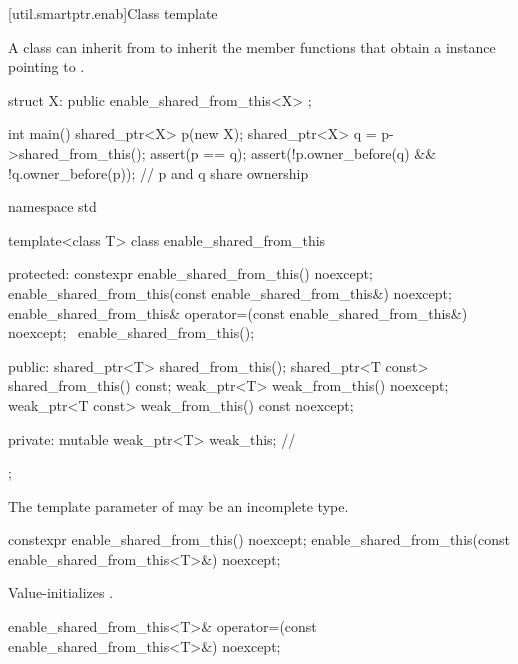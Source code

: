 [util.smartptr.enab]{Class template }

\pnum
{}%
A class  can inherit from 
to inherit the  member functions that obtain
a  instance pointing to .

\pnum
\begin{example}
\begin{codeblock}
struct X: public enable_shared_from_this<X> { };

int main() {
  shared_ptr<X> p(new X);
  shared_ptr<X> q = p->shared_from_this();
  assert(p == q);
  assert(!p.owner_before(q) && !q.owner_before(p)); // p and q share ownership
}
\end{codeblock}
\end{example}

\begin{codeblock}
namespace std {
  template<class T> class enable_shared_from_this {
  protected:
    constexpr enable_shared_from_this() noexcept;
    enable_shared_from_this(const enable_shared_from_this&) noexcept;
    enable_shared_from_this& operator=(const enable_shared_from_this&) noexcept;
    ~enable_shared_from_this();

  public:
    shared_ptr<T> shared_from_this();
    shared_ptr<T const> shared_from_this() const;
    weak_ptr<T> weak_from_this() noexcept;
    weak_ptr<T const> weak_from_this() const noexcept;

  private:
    mutable weak_ptr<T> weak_this;  // \expos
  };
}
\end{codeblock}

\pnum
The template parameter  of 
may be an incomplete type.

%
\begin{itemdecl}
constexpr enable_shared_from_this() noexcept;
enable_shared_from_this(const enable_shared_from_this<T>&) noexcept;
\end{itemdecl}

\begin{itemdescr}
\pnum\effects  Value-initializes .
\end{itemdescr}

%
\begin{itemdecl}
enable_shared_from_this<T>& operator=(const enable_shared_from_this<T>&) noexcept;
\end{itemdecl}

